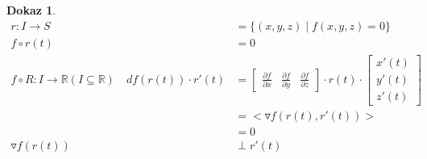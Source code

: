 \documentclass[11pt]{article}
\newcommand{\real}{\mathbb{R}}
\theoremstyle{definition}
\theoremstyle{serbnodot}
\newtheorem*{dokaz}{Dokaz}
\begin{document}
\begin{dokaz}
    
    \begin{align*}
        r: I \to S &= \{(x,y,z) \mid f(x,y,z) = 0\} \\
        f \circ r(t) &= 0\\
        f \circ R: I \to \real (I \subseteq \real) \quad df(r(t)) \cdot r'(t) &=
        \begin{bmatrix}
            \frac{\partial f}{\partial x} & \frac{\partial f}{\partial y} & \frac{\partial f}{\partial z}
        \end{bmatrix}
        \cdot r(t) \cdot \begin{bmatrix}
            x'(t) \\ y'(t) \\ z'(t)
        \end{bmatrix} \\
        &= <\triangledown f(r(t), r'(t))> \\
        &= 0 \\
        \triangledown f(r(t)) &\perp r'(t) 
    \end{align*}
\end{dokaz}
\end{document}
